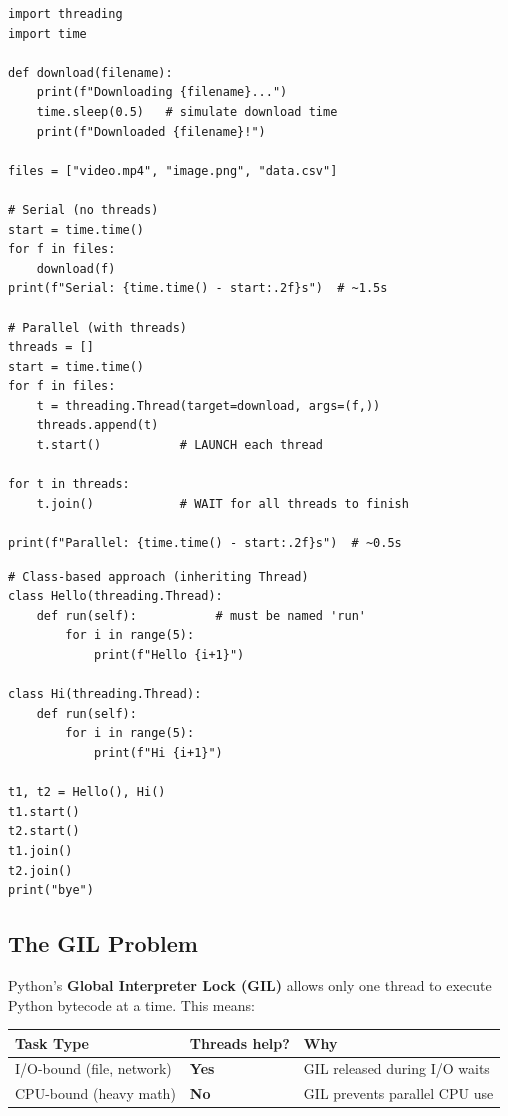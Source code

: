 \documentclass[12pt,a4paper]{article}
\begin{document}
\begin{lstlisting}
import threading
import time

def download(filename):
    print(f"Downloading {filename}...")
    time.sleep(0.5)   # simulate download time
    print(f"Downloaded {filename}!")

files = ["video.mp4", "image.png", "data.csv"]

# Serial (no threads)
start = time.time()
for f in files:
    download(f)
print(f"Serial: {time.time() - start:.2f}s")  # ~1.5s

# Parallel (with threads)
threads = []
start = time.time()
for f in files:
    t = threading.Thread(target=download, args=(f,))
    threads.append(t)
    t.start()           # LAUNCH each thread

for t in threads:
    t.join()            # WAIT for all threads to finish

print(f"Parallel: {time.time() - start:.2f}s")  # ~0.5s
\end{lstlisting}

\begin{lstlisting}
# Class-based approach (inheriting Thread)
class Hello(threading.Thread):
    def run(self):           # must be named 'run'
        for i in range(5):
            print(f"Hello {i+1}")

class Hi(threading.Thread):
    def run(self):
        for i in range(5):
            print(f"Hi {i+1}")

t1, t2 = Hello(), Hi()
t1.start()
t2.start()
t1.join()
t2.join()
print("bye")
\end{lstlisting}

\subsection{The GIL Problem}

Python's \textbf{Global Interpreter Lock (GIL)} allows only one thread to execute Python bytecode at a time. This means:

\begin{center}
\begin{tabular}{lll}
\toprule
\textbf{Task Type} & \textbf{Threads help?} & \textbf{Why} \\
\midrule
I/O-bound (file, network) & \textbf{Yes} & GIL released during I/O waits \\
CPU-bound (heavy math) & \textbf{No} & GIL prevents parallel CPU use \\
\bottomrule
\end{tabular}
\end{center}
\end{document}
